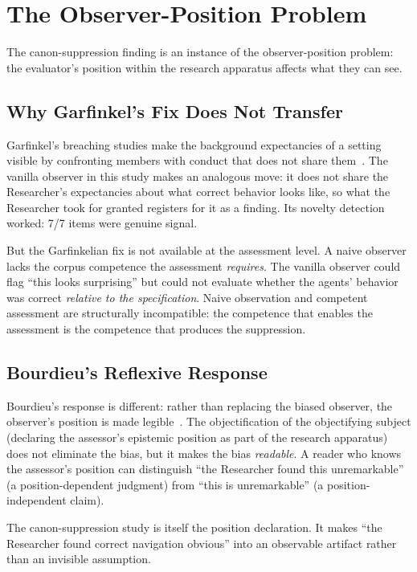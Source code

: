 \documentclass[11pt,a4paper]{article}
\begin{document}
\section{The Observer-Position Problem}

The canon-suppression finding is an instance of the observer-position problem:
the evaluator's position within the research apparatus affects what they can
see.

\subsection{Why Garfinkel's Fix Does Not Transfer}

Garfinkel's breaching studies make the background expectancies of a setting
visible by confronting members with conduct that does not share
them~\citep{garfinkel1967}. The vanilla observer in this study makes an
analogous move: it does not share the Researcher's expectancies about what
correct behavior looks like, so what the Researcher took for granted registers
for it as a finding. Its novelty detection worked: 7/7 items were genuine
signal.

But the Garfinkelian fix is not available at the assessment level. A naive
observer lacks the corpus competence the assessment \emph{requires}. The
vanilla observer could flag ``this looks surprising'' but could not evaluate
whether the agents' behavior was correct \emph{relative to the specification}.
Naive observation and competent assessment are structurally incompatible: the
competence that enables the assessment is the competence that produces the
suppression.

\subsection{Bourdieu's Reflexive Response}

Bourdieu's response is different: rather than replacing the biased observer, the
observer's position is made legible~\citep{bourdieu1992}. The objectification of
the objectifying subject (declaring the assessor's epistemic position as part
of the research apparatus) does not
eliminate the bias, but it makes the bias \emph{readable}. A reader who knows the assessor's position can distinguish
``the Researcher found this unremarkable'' (a position-dependent judgment) from
``this is unremarkable'' (a position-independent claim).

The canon-suppression study is itself the position declaration. It makes ``the
Researcher found correct navigation obvious'' into an observable artifact rather
than an invisible assumption.
\end{document}
